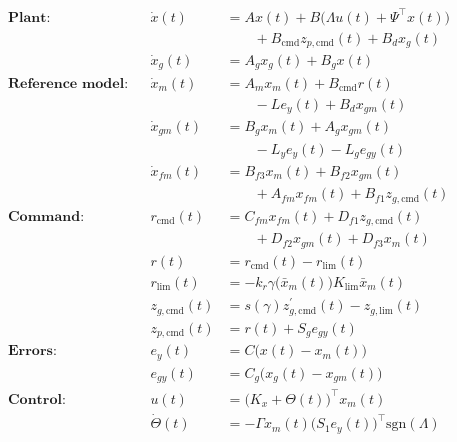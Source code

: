 \documentclass[journal]{IEEEtran}
\theoremstyle{innercustomthm}
\begin{document}
  {%
    \small
    \begin{equation*}
      \begin{aligned}
        \textbf{Plant:}
        && \dot{x}(t) &= Ax(t) + B\bigr(\Lambda u(t) + \Psi^{\top}x(t)\bigr) \\
        &&& \qquad
        + B_{\text{cmd}}z_{p,\text{cmd}}(t) + B_{d}x_{g}(t) \\
        && \dot{x}_{g}(t) &= A_{g}x_{g}(t) + B_{g}x(t) \\
        \textbf{Reference model:}
        && \dot{x}_{m}(t) &= A_{m}x_{m}(t) + B_{\text{cmd}}r(t) \\
        &&& \qquad
        - Le_{y}(t) + B_{d}x_{gm}(t) \\
        && \dot{x}_{gm}(t) &= B_{g}x_{m}(t) + A_{g}x_{gm}(t) \\
        &&& \qquad
        - L_{y}e_{y}(t) - L_{g}e_{gy}(t) \\
        && \dot{x}_{fm}(t) &= B_{f3}x_{m}(t) + B_{f2}x_{gm}(t) \\
        &&& \qquad
        + A_{fm}x_{fm}(t) + B_{f1}z_{g,\text{cmd}}(t) \\
        \textbf{Command:}
        && r_{\text{cmd}}(t) &= C_{fm}x_{fm}(t) + D_{f1}z_{g,\text{cmd}}(t) \\
        &&& \qquad
        + D_{f2}x_{gm}(t) + D_{f3} x_{m}(t) \\
        && r(t) &= r_{\text{cmd}}(t) - r_{\text{lim}}(t) \\
        && r_{\text{lim}}(t) &= -k_{r}\gamma\bigr(\bar{x}_{m}(t)\bigr) K_{\text{lim}}\bar{x}_{m}(t) \\
        && z_{g,\text{cmd}}(t) &= s(\gamma)z_{g,\text{cmd}}^{\prime}(t) - z_{g,\text{lim}}(t) \\
        && z_{p,\text{cmd}}(t) &= r(t) + S_{g}e_{gy}(t) \\
        \textbf{Errors:}
        && e_{y}(t) &= C\bigr(x(t)-x_{m}(t)\bigr) \\
        && e_{gy}(t) &= C_{g}\bigr(x_{g}(t) - x_{gm}(t)\bigr) \\
        \textbf{Control:}
        && u(t) &= \bigr(K_{x}+\Theta(t)\bigr)^{\top}x_{m}(t) \\
        && \dot{\Theta}(t) &= -\Gamma x_{m}(t)\bigr(S_{1}e_{y}(t)\bigr)^{\top}\text{sgn}(\Lambda) \\
      \end{aligned}
    \end{equation*}
  }\\[-32pt]
\end{document}
